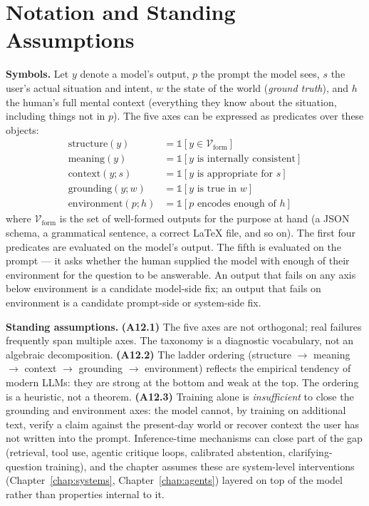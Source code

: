 \section{Notation and Standing Assumptions}
\label{sec:ch13-notation}

\begin{notationbox}
\textbf{Symbols.}
Let $y$ denote a model's output, $p$ the prompt the model sees,
$s$ the user's actual situation and intent, $w$ the state of the
world (\emph{ground truth}), and $h$ the human's full mental
context (everything they know about the situation, including
things not in $p$). The five axes can be expressed as predicates
over these objects:
\begin{align}
  \mathrm{structure}(y) &= \mathbb{1}\!\left[y \in \mathcal{V}_{\mathrm{form}}\right] \label{eq:ch13-structure}\\
  \mathrm{meaning}(y) &= \mathbb{1}\!\left[y \text{ is internally consistent}\right] \label{eq:ch13-meaning}\\
  \mathrm{context}(y; s) &= \mathbb{1}\!\left[y \text{ is appropriate for } s\right] \label{eq:ch13-context}\\
  \mathrm{grounding}(y; w) &= \mathbb{1}\!\left[y \text{ is true in } w\right] \label{eq:ch13-grounding}\\
  \mathrm{environment}(p; h) &= \mathbb{1}\!\left[p \text{ encodes enough of } h\right] \label{eq:ch13-environment}
\end{align}
where $\mathcal{V}_{\mathrm{form}}$ is the set of well-formed
outputs for the purpose at hand (a JSON schema, a grammatical
sentence, a correct LaTeX file, and so on). The first four
predicates are evaluated on the model's output. The fifth is
evaluated on the prompt --- it asks whether the human supplied the
model with enough of their environment for the question to be
answerable. An output that fails on any axis below environment is
a candidate model-side fix; an output that fails on environment is
a candidate prompt-side or system-side fix.

\textbf{Standing assumptions.}
\textbf{(A12.1)} The five axes are not orthogonal; real failures
frequently span multiple axes. The taxonomy is a diagnostic
vocabulary, not an algebraic decomposition.
\textbf{(A12.2)} The ladder ordering (structure $\to$ meaning $\to$
context $\to$ grounding $\to$ environment) reflects the empirical
tendency of modern LLMs: they are strong at the bottom and weak at
the top. The ordering is a heuristic, not a theorem.
\textbf{(A12.3)} Training alone is \emph{insufficient} to close
the grounding and environment axes: the model cannot, by training
on additional text, verify a claim against the present-day world
or recover context the user has not written into the prompt.
Inference-time mechanisms can close part of the gap (retrieval,
tool use, agentic critique loops, calibrated abstention,
clarifying-question training), and the chapter assumes these are
system-level interventions (Chapter~\ref{chap:systems}, Chapter~\ref{chap:agents}) layered on top
of the model rather than properties internal to it.
\end{notationbox}

